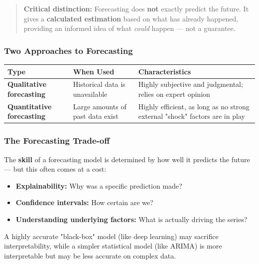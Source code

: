 \documentclass[12pt,openany]{book}
\begin{document}
\begin{quote}
\textbf{Critical distinction:} Forecasting does \textbf{not} exactly predict the future. It gives a \textbf{calculated estimation} based on what has already happened, providing an informed idea of what \textit{could} happen --- not a guarantee.\par

\end{quote}

\subsubsection{Two Approaches to Forecasting}

\begin{center}
\begin{tabular}{|L{0.22\textwidth}|L{0.32\textwidth}|L{0.32\textwidth}|}
\hline
Type & When Used & Characteristics \\
\hline
\textbf{Qualitative forecasting} & Historical data is unavailable & Highly subjective and judgmental; relies on expert opinion \\
\hline
\textbf{Quantitative forecasting} & Large amounts of past data exist & Highly efficient, as long as no strong external "shock" factors are in play \\
\hline
\end{tabular}
\end{center}

\subsubsection{The Forecasting Trade-off}

The \textbf{skill} of a forecasting model is determined by how well it predicts the future --- but this often comes at a cost:

\begin{itemize}[leftmargin=*]
    \item \textbf{Explainability:} Why was a specific prediction made?
    \item \textbf{Confidence intervals:} How certain are we?
    \item \textbf{Understanding underlying factors:} What is actually driving the series?
\end{itemize}

A highly accurate "black-box" model (like deep learning) may sacrifice interpretability, while a simpler statistical model (like ARIMA) is more interpretable but may be less accurate on complex data.
\end{document}
